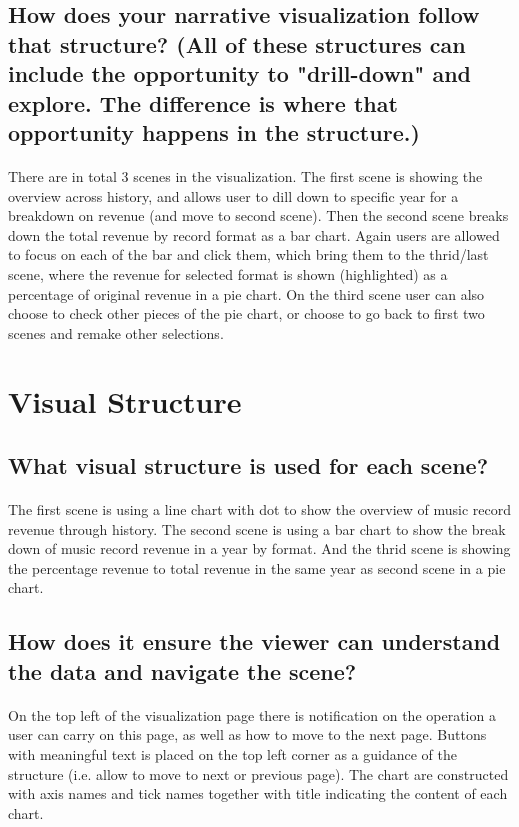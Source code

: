 \documentclass[letterpaper, 11pt]{article}
\begin{document}
\subsection{How does your narrative visualization follow that structure? (All of these structures can include the opportunity to "drill-down" and explore. The difference is where that opportunity happens in the structure.)}
\label{subsec:NarrativeStructure2}
\paragraph{}There are in total 3 scenes in the visualization. The first scene is showing the overview across history, and allows user to dill down to specific year for a breakdown on revenue (and move to second scene). Then the second scene breaks down the total revenue by record format as a bar chart. Again users are allowed to focus on each of the bar and click them, which bring them to the thrid/last scene, where the revenue for selected format is shown (highlighted) as a percentage of original revenue in a pie chart.
On the third scene user can also choose to check other pieces of the pie chart, or choose to go back to first two scenes and remake other selections.

\section{Visual Structure}
\label{sec:VisualStructure}
\subsection{What visual structure is used for each scene?}
\label{subsec:VisualStructure1}
\paragraph{} The first scene is using a line chart with dot to show the overview of music record revenue through history.
The second scene is using a bar chart to show the break down of music record revenue in a year by format. And the thrid scene is showing the percentage revenue to total revenue in the same year as second scene in a pie chart.
\subsection{How does it ensure the viewer can understand the data and navigate the scene?}
\label{subsec:VisualStructure2}
\paragraph{}On the top left of the visualization page there is notification on the operation a user can carry on this page, as well as how to move to the next page. Buttons with meaningful text is placed on the top left corner as a guidance of the structure (i.e. allow to move to next or previous page).
The chart are constructed with axis names and tick names together with title indicating the content of each chart.
\end{document}
